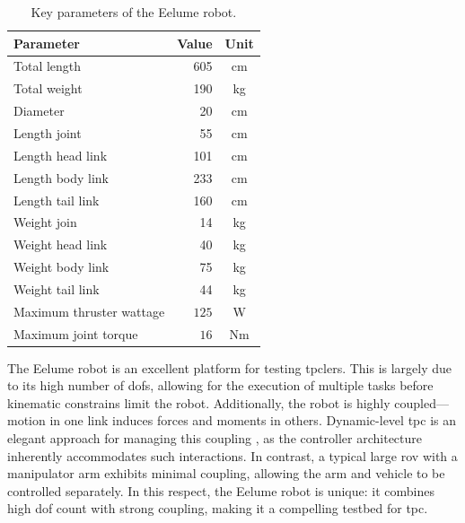 \begin{table}[h]
    \centering
    \begin{tabular}{|l|r|c|}
        \hline
        Parameter  & Value & Unit   \\ \hline \hline
        Total length & 605 &  cm    \\ \hline
        Total weight & 190  & kg    \\ \hline
        Diameter & 20 & cm    \\ \hline
        Length joint     & 55 & cm    \\ \hline
        Length head link & 101 & cm     \\ \hline
        Length body link & 233 & cm     \\ \hline
        Length tail link & 160 & cm     \\ \hline
        Weight join      & 14 & kg     \\ \hline
        Weight head link & 40 & kg     \\ \hline
        Weight body link & 75 & kg     \\ \hline
        Weight tail link & 44 & kg     \\ \hline
        Maximum thruster wattage & \(125\) & W     \\ \hline
        Maximum joint torque & \(16\) & Nm     \\ \hline
        \hline
    \end{tabular}
    \caption{Key parameters of the Eelume robot.}
    \label{tab:eelume:keynumbers}
\end{table}

The Eelume robot is an excellent platform for testing \gls{tpc}lers.
This is largely due to its high number of \gls{dof}s, allowing for the 
execution of multiple tasks before kinematic constrains limit the robot. Additionally, 
the robot is highly coupled—motion in one link induces forces and moments in 
others. Dynamic-level \gls{tpc} is an elegant approach for managing this coupling
, as the controller architecture inherently accommodates such interactions. In 
contrast, a typical large \gls{rov} with a manipulator arm exhibits minimal 
coupling, allowing the arm and vehicle to be controlled separately. In this 
respect, the Eelume robot is unique: it combines high \gls{dof} count with 
strong coupling, making it a compelling testbed for \gls{tpc}.


